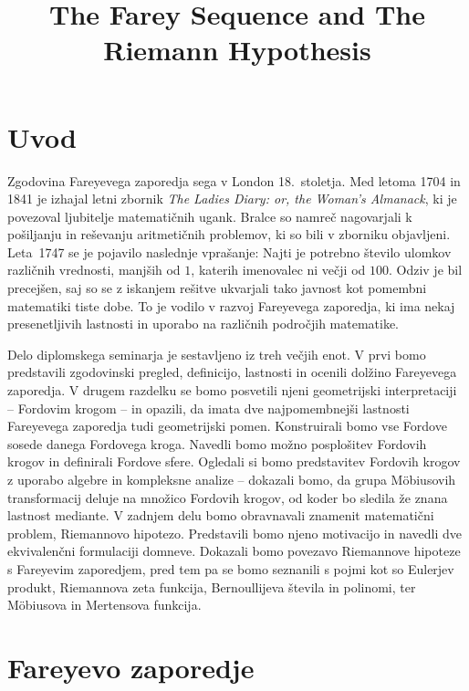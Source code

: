 \documentclass[mat1]{fmfdelo}
\title{The Farey Sequence and The Riemann Hypothesis}
\begin{document}
%
\section{Uvod}

Zgodovina Fareyevega zaporedja sega v London 18.~stoletja. Med letoma 1704 in 1841 je izhajal letni zbornik \emph{The Ladies Diary: or, the Woman's Almanack}, ki je povezoval ljubitelje matematičnih ugank. Bralce so namreč nagovarjali k pošiljanju in reševanju aritmetičnih problemov, ki so bili v zborniku objavljeni. Leta~1747 se je pojavilo naslednje vprašanje: Najti je potrebno število ulomkov različnih vrednosti, manjših od $1$, katerih imenovalec ni večji od $100$. Odziv je bil precejšen, saj so se z iskanjem rešitve ukvarjali tako javnost kot pomembni matematiki tiste dobe. To je vodilo v razvoj Fareyevega zaporedja, ki ima nekaj presenetljivih lastnosti in uporabo na različnih področjih matematike.

Delo diplomskega seminarja je sestavljeno iz treh večjih enot. V prvi bomo predstavili zgodovinski pregled, definicijo, lastnosti in ocenili dolžino Fareyevega zaporedja. V drugem razdelku se bomo posvetili njeni geometrijski interpretaciji -- Fordovim krogom -- in opazili, da imata dve najpomembnejši lastnosti Fareyevega zaporedja tudi geometrijski pomen. Konstruirali bomo vse Fordove sosede danega Fordovega kroga. Navedli bomo možno posplošitev Fordovih krogov in definirali Fordove sfere. Ogledali si bomo predstavitev Fordovih krogov z uporabo algebre in kompleksne analize -- dokazali bomo, da grupa M\"obiusovih transformacij deluje na množico Fordovih krogov, od koder bo sledila že znana lastnost mediante. V zadnjem delu bomo obravnavali znamenit matematični problem, Riemannovo hipotezo. Predstavili bomo njeno motivacijo in navedli dve ekvivalenčni formulaciji domneve. Dokazali bomo povezavo Riemannove hipoteze s Fareyevim zaporedjem, pred tem pa se bomo seznanili s pojmi kot so Eulerjev produkt, Riemannova zeta funkcija, Bernoullijeva števila in polinomi, ter M\"obiusova in Mertensova funkcija.

%
\section{Fareyevo zaporedje}
\end{document}
